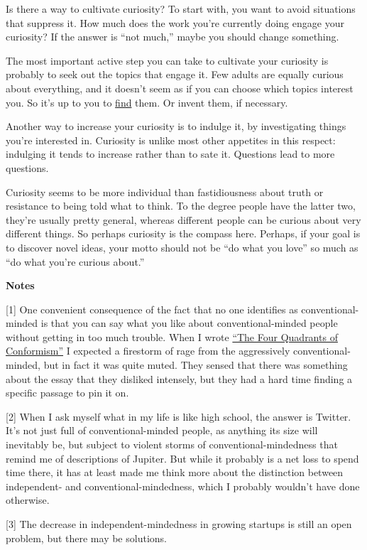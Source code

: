 Is there a way to cultivate curiosity? To start with, you want to avoid
situations that suppress it. How much does the work you're currently
doing engage your curiosity? If the answer is ``not much,'' maybe you
should change something.

The most important active step you can take to cultivate your curiosity
is probably to seek out the topics that engage it. Few adults are
equally curious about everything, and it doesn't seem as if you can
choose which topics interest you. So it's up to you to
\href{genius.html}{find} them. Or invent them, if necessary.

Another way to increase your curiosity is to indulge it, by
investigating things you're interested in. Curiosity is unlike most
other appetites in this respect: indulging it tends to increase rather
than to sate it. Questions lead to more questions.

Curiosity seems to be more individual than fastidiousness about truth or
resistance to being told what to think. To the degree people have the
latter two, they're usually pretty general, whereas different people can
be curious about very different things. So perhaps curiosity is the
compass here. Perhaps, if your goal is to discover novel ideas, your
motto should not be ``do what you love'' so much as ``do what you're
curious about.''

\textbf{Notes}

{[}1{]} One convenient consequence of the fact that no one identifies as
conventional-minded is that you can say what you like about
conventional-minded people without getting in too much trouble. When I
wrote \href{conformism.html}{``The Four Quadrants of Conformism''} I
expected a firestorm of rage from the aggressively conventional-minded,
but in fact it was quite muted. They sensed that there was something
about the essay that they disliked intensely, but they had a hard time
finding a specific passage to pin it on.

{[}2{]} When I ask myself what in my life is like high school, the
answer is Twitter. It's not just full of conventional-minded people, as
anything its size will inevitably be, but subject to violent storms of
conventional-mindedness that remind me of descriptions of Jupiter. But
while it probably is a net loss to spend time there, it has at least
made me think more about the distinction between independent- and
conventional-mindedness, which I probably wouldn't have done otherwise.

{[}3{]} The decrease in independent-mindedness in growing startups is
still an open problem, but there may be solutions.

